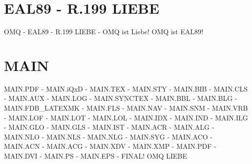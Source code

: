 \documentclass{MAIN}
\begin{document}
\maketitle
\section*{EAL89 - R.199 LIEBE}
OMQ - EAL89 - R.199 LIEBE - OMQ ist Liebe! OMQ ist EAL89!
\section*{MAIN}
MAIN.PDF - MAIN.iQxD - MAIN.TEX - MAIN.STY - MAIN.BIB - MAIN.CLS - MAIN.AUX - MAIN.LOG - MAIN.SYNCTEX - MAIN.BBL - MAIN.BLG - MAIN.FDB_LATEXMK - MAIN.FLS - MAIN.NAV - MAIN.SNM - MAIN.VRB - MAIN.LOF - MAIN.LOT - MAIN.LOL - MAIN.IDX - MAIN.IND - MAIN.ILG - MAIN.GLO - MAIN.GLS - MAIN.IST - MAIN.ACR - MAIN.ALG - MAIN.NLO - MAIN.NLS - MAIN.NLG - MAIN.SYG - MAIN.ACO - MAIN.ACN - MAIN.ACG - MAIN.XDV - MAIN.XMP - MAIN.PDF - MAIN.DVI - MAIN.PS - MAIN.EPS - FINAL!
\cite{omq_eal89}
\ac{OMQ}
\ac{LIEBE}

\printindex
\printglossary
\printnomenclature
\printacronyms
\end{document}
